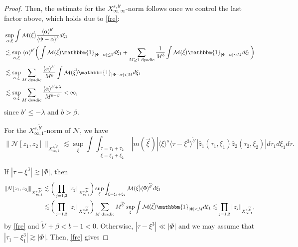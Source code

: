 \documentclass[a4paper,
11pt,  reqno]{amsart}
\newcommand{\jap}[1]{\langle #1 \rangle}
\newcommand{\5}{\textup{V}}
\newcommand{\noi}{\noindent}
\newcommand{\ft}{\widehat}
\newcommand{\les}{\lesssim}
\newcommand{\wt}{\widetilde}
\theoremstyle{remark}
\newcommand{\jb}[1]
{\langle #1 \rangle}
\numberwithin{equation}{section}
\numberwithin{theorem}{section}
\newcommand{\Ncal}{\mathcal{N}}
\begin{document}
\begin{proof}
		\noi 
Then, the estimate for the $X^{s, b'}_{\infty, \infty}$-norm follows once we control the last factor above, which holds due to \eqref{fre}:
			\begin{align}
			&
            \sup_{\alpha,\xi} \int \mathcal{M}(\vec\xi)\frac{\jap{\alpha}^{b'}}{\jap{\Phi-\alpha}^b  } d\xi_1
            \\
&
\les 
\sup_{\alpha,\xi}
\ \jap{\alpha}^{b'}
\bigg( 
\int \mathcal{M}(\vec\xi)\mathbbm{1}_{|\Phi-\alpha|\le 1} d\xi_1
+
\sum_{M\ge 1 \text{ dyadic}} \frac{1}{M^{b}}\int \mathcal{M}(\vec\xi)\mathbbm{1}_{|\Phi-\alpha|\sim M} d\xi_1 
\bigg)
\\
&\les 
\sup_{\alpha,\xi}\sum_{M \text{ dyadic}} \frac{\jap{\alpha}^{b'}}{M^{b}}\int \mathcal{M}(\vec\xi)\mathbbm{1}_{|\Phi-\alpha|<M} d\xi_1
\\
&
\lesssim \sup_{\alpha,\xi}\sum_{M \text{ dyadic}} \frac{\jap{\alpha}^{b'+\lambda}}{M^{b-\beta}} 
<\infty,
			\end{align}
			since $b'\le -\lambda$ and $b>\beta$.


For the $X^{s,\wt{b}'}_{\infty, 1}$-norm of $\Ncal$, we have 
\begin{equation}
				\|\Ncal[z_1,z_2]\|_{X^{s,\wt{b}'}_{\infty,1}} \lesssim \sup_\xi
\int  \int_{\substack{\tau=\tau_1+\tau_2 \\ \xi = \xi_1 + \xi_2}} 
|m(\vec\xi)|
\jb{\xi}^s
 \jap{\tau-\xi^3}^{\wt{b}'}  | \ft{z}_1 (\tau_1, \xi_1) \ft{z}_2(\tau_2, \xi_2)|  d\tau_1 d\xi_1 d\tau.
			\end{equation}

        \noi 
			If $|\tau-\xi^3|\gtrsim |\Phi|$, then
			\begin{align}
				\|\Ncal[z_1,z_2]\|_{X^{s,\wt{b}'}_{\infty,1}} 
&
\lesssim 
\bigg( 
\prod_{j=1, 2}\|z_j\|_{X^{s,\wt{b}}_{\infty,1}}
\bigg)
\sup_\xi \int_{\xi=\xi_1+\xi_2} \mathcal{M}(\vec\xi) \jap{\Phi}^{\wt{b}'} d\xi_1  \\
&
\lesssim 
\bigg( 
\prod_{j=1, 2}\|z_j\|_{X^{s,\wt{b}}_{\infty,1}}
\bigg)
\sum_{M \text{ dyadic}} M^{\wt{b}'} \sup_\xi \int \mathcal{M} (\vec\xi)
\mathbbm{1}_{|\Phi|<M} d\xi_1 
 \lesssim 
\prod_{j=1, 2}\|z_j\|_{X^{s,\wt{b}}_{\infty,1}} ,
			\end{align}
			by \eqref{fre} and $\wt{b}'+\beta<b-1<0$. 
Otherwise, $|\tau-\xi^3|\ll |\Phi|$ and we may assume that $|\tau_1-\xi_1^3|\gtrsim |\Phi|$. Then, \eqref{fre} gives



\end{proof}
\end{document}
